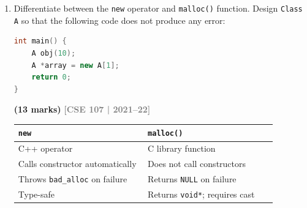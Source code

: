 \documentclass[12pt,a3paper]{article}
\newcommand{\yr}[1]{\hfill\textcolor{gray}{\small\textbf{[#1]}}}
\newcommand{\mk}[1]{\textcolor{orange!70!black}{\small\textbf{(#1 marks)}}}
\begin{document}
\begin{enumerate}
\begin{tcolorbox}
\textbf{Solution --- overload \texttt{operator=}:}
\begin{lstlisting}[language=C++]
#include <iostream>
#include <cstring>
using namespace std;

class strtype {
    char *p; int len;
public:
    strtype(char *s) {
        len = strlen(s)+1; p = new char[len]; strcpy(p,s);
    }
    ~strtype() { delete[] p; }

    strtype& operator=(const strtype& obj) {
        if (this == &obj) return *this; // self-assignment guard
        delete[] p;                     // free old memory
        len = obj.len;
        p = new char[len];              // allocate fresh memory
        strcpy(p, obj.p);
        return *this;
    }
    void show() const { cout << p << "\n"; }
};

int main() {
    strtype s1("LEVEL"), s2("TERM");
    s1 = s2;
    s1.show();  // TERM
    s2.show();  // TERM
}
\end{lstlisting}

\end{tcolorbox}


\item Differentiate between the \texttt{new} operator and \texttt{malloc()} function. Design \texttt{Class A} so that the following code does not produce any error:
\begin{lstlisting}[language=C++]
int main() {
    A obj(10);
    A *array = new A[1];
    return 0;
}
\end{lstlisting}
\mk{13}
\yr{CSE 107 | 2021--22}


\begin{tcolorbox}[enhanced,breakable,ansbox,colback=cE!4,colframe=cE,
  boxrule=0.8pt,arc=5pt,
  title={\textbf{Answer --- new vs malloc; design Class A}},
  fonttitle=\bfseries\color{white},colbacktitle=cE]

\begin{center}
\small
\begin{tabular}{@{}p{0.44\linewidth}p{0.44\linewidth}@{}}
\toprule
\textbf{\texttt{new}} & \textbf{\texttt{malloc()}} \\ \midrule
C++ operator & C library function \\
Calls constructor automatically & Does not call constructors \\
Throws \texttt{bad\_alloc} on failure & Returns \texttt{NULL} on failure \\
Type-safe & Returns \texttt{void*}; requires cast \\
\bottomrule
\end{tabular}
\end{center}


\end{tcolorbox}
\end{enumerate}
\end{document}
